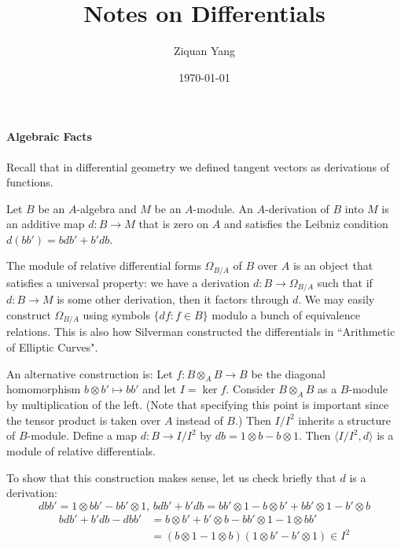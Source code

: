 \documentclass[12pt]{article}
\theoremstyle{plain}
\theoremstyle{definition}
\newcommand\tensor{{\otimes}}
\newcommand{\<}{\langle}
\renewcommand{\>}{\rangle}
\newcommand{\Ohm}{\Omega}
\begin{document}
%

\title{Notes on Differentials}
\author{Ziquan Yang}


\date{\today}

\maketitle

 


\setcounter{section}{0}

\paragraph{Algebraic Facts} Recall that in differential geometry we defined tangent vectors as derivations of functions. 

Let $B$ be an $A$-algebra and $M$ be an $A$-module. An $A$-derivation of $B$ into $M$ is an additive map $d : B \to M$ that is zero on $A$ and satisfies the Leibniz condition $d(bb') = b db' + b' db$. 

The module of relative differential forms $\Ohm_{B/A}$ of $B$ over $A$ is an object that satisfies a universal property: we have a derivation $d : B \to \Ohm_{B/A}$ such that if $d : B \to M$ is some other derivation, then it factors through $d$. We may easily construct $\Ohm_{B/A}$ using symbols $\{ df : f \in B \}$ modulo a bunch of equivalence relations. This is also how Silverman constructed the differentials in ``Arithmetic of Elliptic Curves". 

An alternative construction is: Let $f : B \tensor_A B \to B$ be the diagonal homomorphism $b \tensor b' \mapsto bb'$ and let $I = \ker f$. Consider $B \tensor_A B$ as a $B$-module by multiplication of the left. (Note that specifying this point is important since the tensor product is taken over $A$ instead of $B$.) Then $I/I^2$ inherits a structure of $B$-module. Define a map $d : B \to I/I^2$ by $db = 1 \tensor b - b \tensor 1$. Then $\< I/I^2, d\>$ is a module of relative differentials. 

To show that this construction makes sense, let us check briefly that $d$ is a derivation:
$$ dbb' = 1 \tensor bb' - bb' \tensor 1, \, bdb' + b' db = bb' \tensor 1 - b \tensor b' + bb' \tensor 1 - b' \tensor b$$
\begin{align*} 
bdb' + b' db - dbb' &= b \tensor b' + b' \tensor b - bb' \tensor 1 - 1 \tensor bb' \\
&= (b \tensor 1 - 1 \tensor b)(1 \tensor b' - b' \tensor 1) \in I^2 
\end{align*}
\end{document}
